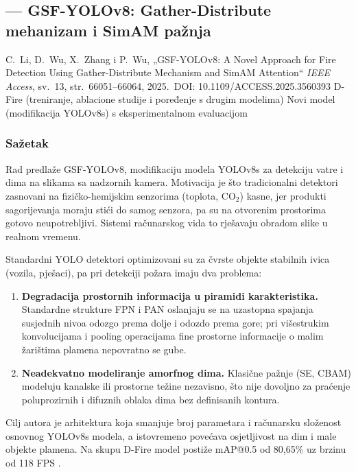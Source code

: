 %
\clearpage
\subsection{\texorpdfstring{\AutorE}{Haris Macić} --- GSF-YOLOv8: Gather-Distribute mehanizam i SimAM pažnja}

\paperbox{\AutorE}
  {C.\ Li, D.\ Wu, X.\ Zhang i P.\ Wu, „GSF-YOLOv8: A Novel Approach for Fire Detection Using Gather-Distribute Mechanism and SimAM Attention“ \cite{ligsf}}
  {\emph{IEEE Access}, sv.\ 13, str.\ 66051--66064, 2025.\ DOI: 10.1109/ACCESS.2025.3560393}
  {D-Fire (treniranje, ablacione studije i poređenje s drugim modelima)}
  {Novi model (modifikacija YOLOv8s) s eksperimentalnom evaluacijom}

\subsubsection{Sažetak}
Rad predlaže GSF-YOLOv8, modifikaciju modela YOLOv8s \cite{jocher} za detekciju vatre i dima na slikama sa nadzornih kamera. Motivacija je što tradicionalni detektori zasnovani na fizičko-hemijskim senzorima (toplota, CO$_2$) kasne, jer produkti sagorijevanja moraju stići do samog senzora, pa su na otvorenim prostorima gotovo neupotrebljivi. Sistemi računarskog vida to rješavaju obradom slike u realnom vremenu.

Standardni YOLO detektori optimizovani su za čvrste objekte stabilnih ivica (vozila, pješaci), pa pri detekciji požara imaju dva problema:
\begin{enumerate}
  \item \textbf{Degradacija prostornih informacija u piramidi karakteristika.} Standardne strukture FPN i PAN oslanjaju se na uzastopna spajanja susjednih nivoa odozgo prema dolje i odozdo prema gore; pri višestrukim konvolucijama i pooling operacijama fine prostorne informacije o malim žarištima plamena nepovratno se gube.
  \item \textbf{Neadekvatno modeliranje amorfnog dima.} Klasične pažnje (SE, CBAM) modeluju kanalske ili prostorne težine nezavisno, što nije dovoljno za praćenje poluprozirnih i difuznih oblaka dima bez definisanih kontura.
\end{enumerate}
Cilj autora je arhitektura koja smanjuje broj parametara i računarsku složenost osnovnog YOLOv8s modela, a istovremeno povećava osjetljivost na dim i male objekte plamena. Na skupu D-Fire model postiže mAP@0.5 od 80,65\% uz brzinu od 118 FPS \cite{ligsf}.

